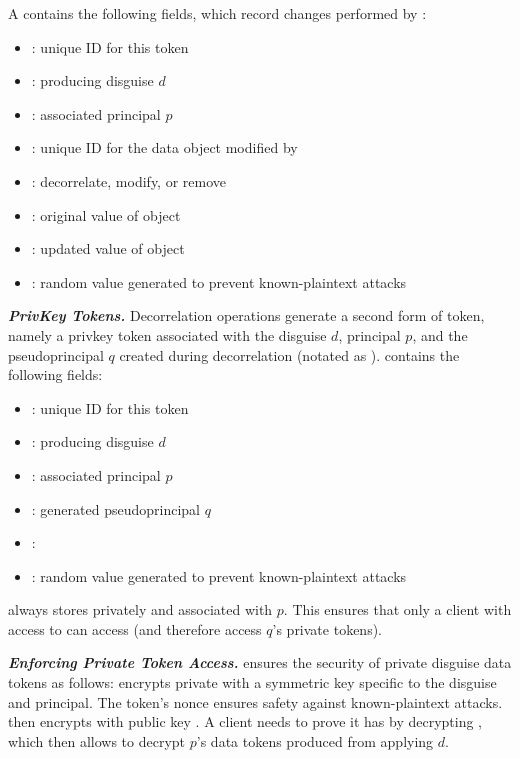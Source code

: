 A  contains the following fields, which record changes performed by :
\begin{itemize}
\item {}: unique ID for this token
\item {}: producing disguise $d$ 
\item {}: associated principal $p$
\item {}: unique ID for the data object modified by 
\item {}: decorrelate, modify, or remove
\item {}: original value of object 
\item {}: updated value of object 
\item {}: random value generated to prevent known-plaintext attacks
\end{itemize}

\noindent\textbf{\emph{PrivKey Tokens.}}
Decorrelation operations generate a second form of token, namely a privkey token associated with the disguise $d$, principal $p$, and the pseudoprincipal $q$ created
during decorrelation (notated as ).
 contains the following fields:
\begin{itemize}
\item {}: unique ID for this token
\item {}: producing disguise $d$ 
\item {}: associated principal $p$
\item {}: generated pseudoprincipal $q$
\item {}: 
\item {}: random value generated to prevent known-plaintext attacks
\end{itemize}
\sys always stores  privately and associated with $p$. This ensures that only a client
with access to  can access  (and therefore access $q$'s private tokens).

\vspace{12pt}
\noindent\textbf{\emph{Enforcing Private Token Access.}}
\sys ensures the security of private disguise data tokens as follows: \sys encrypts private 
with a symmetric key  specific to the disguise and principal. The
token's nonce ensures safety against known-plaintext attacks. \sys then encrypts  with
public key .
A client needs to prove it has  by decrypting , 
which then allows \sys to decrypt $p$'s data tokens produced from applying $d$.

